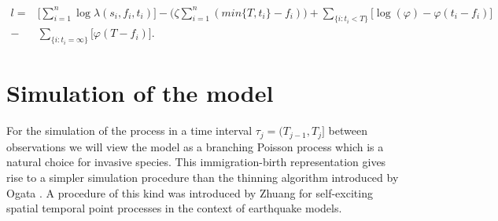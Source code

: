 \documentclass[11pt,a4paper]{article}
\begin{document}
{\color{red}
\begin{equation*}
    \begin{aligned}
        l = & \Bigg[ \sum_{i = 1}^{n} \log \lambda(s_{i},f_{i}, t_{i}) \Bigg] - \bigg(\zeta \sum_{i=1}^{n} (min\{ T, t_i \} - f_i) \bigg)  + \sum_{\{ i : t_{i} < T \} }  \bigg[\log (\varphi) -\varphi(t_{i} - f_{i}) \bigg] \\
        - & \sum_{ \{ i : t_{i} = \infty \} } \bigg[\varphi(T - f_{i}) \bigg].
    \end{aligned}
\end{equation*}

{\color{red}\section{Simulation of the model} \label{section:simulationModel}

For the simulation of the process in a time interval $\tau_j = (T_{j-1}, T_j]$ between observations we will view the model as a branching Poisson process \cite{Lewis} which is a natural choice for invasive species. This immigration-birth representation gives rise to a simpler simulation procedure than the thinning algorithm introduced by Ogata \cite{Ogata}. A procedure of this kind was introduced by Zhuang \cite{Zhuang} for self-exciting spatial temporal point processes in the context of earthquake models.

}}
\end{document}
